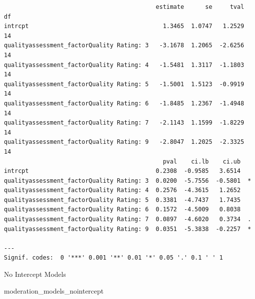 \documentclass[
  letterpaper,
  DIV=11,
  numbers=noendperiod]{scrartcl}
\newenvironment{Shaded}{\begin{snugshade}}{\end{snugshade}}
\newcommand{\NormalTok}[1]{\textcolor[rgb]{0.00,0.23,0.31}{#1}}
\begin{document}
\begin{verbatim}
                                           estimate      se     tval  df 
intrcpt                                      1.3465  1.0747   1.2529  14 
qualityassessment_factorQuality Rating: 3   -3.1678  1.2065  -2.6256  14 
qualityassessment_factorQuality Rating: 4   -1.5481  1.3117  -1.1803  14 
qualityassessment_factorQuality Rating: 5   -1.5001  1.5123  -0.9919  14 
qualityassessment_factorQuality Rating: 6   -1.8485  1.2367  -1.4948  14 
qualityassessment_factorQuality Rating: 7   -2.1143  1.1599  -1.8229  14 
qualityassessment_factorQuality Rating: 9   -2.8047  1.2025  -2.3325  14 
                                             pval    ci.lb    ci.ub    
intrcpt                                    0.2308  -0.9585   3.6514    
qualityassessment_factorQuality Rating: 3  0.0200  -5.7556  -0.5801  * 
qualityassessment_factorQuality Rating: 4  0.2576  -4.3615   1.2652    
qualityassessment_factorQuality Rating: 5  0.3381  -4.7437   1.7435    
qualityassessment_factorQuality Rating: 6  0.1572  -4.5009   0.8038    
qualityassessment_factorQuality Rating: 7  0.0897  -4.6020   0.3734  . 
qualityassessment_factorQuality Rating: 9  0.0351  -5.3838  -0.2257  * 

---
Signif. codes:  0 '***' 0.001 '**' 0.01 '*' 0.05 '.' 0.1 ' ' 1
\end{verbatim}

No Intercept Models

\begin{Shaded}
\begin{Highlighting}[]
\NormalTok{moderation\_models\_nointercept}
\end{Highlighting}
\end{Shaded}
\end{document}
